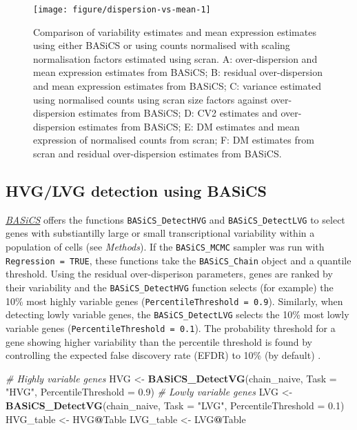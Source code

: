 \documentclass[9pt,a4paper,]{extarticle}
\newenvironment{Shaded}{\begin{snugshade}}{\end{snugshade}}
\newcommand{\CommentTok}[1]{\textcolor[rgb]{0.56,0.35,0.01}{\textit{#1}}}
\newcommand{\DataTypeTok}[1]{\textcolor[rgb]{0.13,0.29,0.53}{#1}}
\newcommand{\FloatTok}[1]{\textcolor[rgb]{0.00,0.00,0.81}{#1}}
\newcommand{\KeywordTok}[1]{\textcolor[rgb]{0.13,0.29,0.53}{\textbf{#1}}}
\newcommand{\NormalTok}[1]{#1}
\newcommand{\OperatorTok}[1]{\textcolor[rgb]{0.81,0.36,0.00}{\textbf{#1}}}
\newcommand{\StringTok}[1]{\textcolor[rgb]{0.31,0.60,0.02}{#1}}
\begin{document}
\begin{figure}

{\centering \texttt{[image: figure/dispersion-vs-mean-1]} 

}

\caption{Comparison of variability estimates and mean expression estimates using either BASiCS or using counts normalised with scaling normalisation factors estimated using scran. A: over-dispersion and mean expression estimates from BASiCS; B: residual over-dispersion and mean expression estimates from BASiCS; C: variance estimated using normalised counts using scran size factors against over-dispersion estimates from BASiCS; D: CV2 estimates and over-dispersion estimates from BASiCS; E: DM estimates and mean expression of normalised counts from scran; F: DM estimates from scran and residual over-dispersion estimates from BASiCS.}\label{fig:dispersion-vs-mean}
\end{figure}

\hypertarget{hvglvg-detection-using-basics}{%
\subsection{HVG/LVG detection using BASiCS}\label{hvglvg-detection-using-basics}}

\emph{\href{https://bioconductor.org/packages/3.11/BASiCS}{BASiCS}} offers the functions \texttt{BASiCS\_DetectHVG} and
\texttt{BASiCS\_DetectLVG} to select genes with substiantilly large or small
transcriptional variability within a population of cells (see \emph{Methods}).
If the \texttt{BASiCS\_MCMC} sampler was run with \texttt{Regression\ =\ TRUE},
these functions take the \texttt{BASiCS\_Chain} object and a quantile threshold.
Using the residual over-disperison parameters, genes are ranked by their
variability and the \texttt{BASiCS\_DetectHVG} function selects (for example) the
10\% most highly variable genes (\texttt{PercentileThreshold\ =\ 0.9}).
Similarly, when detecting lowly variable genes, the \texttt{BASiCS\_DetectLVG} selects
the 10\% most lowly variable genes (\texttt{PercentileThreshold\ =\ 0.1}).
The probability threshold for a gene showing higher variability than the
percentile threshold is found by controlling the expected false discovery
rate (EFDR) to 10\% (by default) \citep{Newton2004}.

\begin{Shaded}
\begin{Highlighting}[]
\CommentTok{# Highly variable genes}
\NormalTok{HVG <-}\StringTok{ }\KeywordTok{BASiCS_DetectVG}\NormalTok{(chain_naive, }\DataTypeTok{Task =} \StringTok{"HVG"}\NormalTok{, }\DataTypeTok{PercentileThreshold =} \FloatTok{0.9}\NormalTok{)}
\CommentTok{# Lowly variable genes}
\NormalTok{LVG <-}\StringTok{ }\KeywordTok{BASiCS_DetectVG}\NormalTok{(chain_naive, }\DataTypeTok{Task =} \StringTok{"LVG"}\NormalTok{, }\DataTypeTok{PercentileThreshold =} \FloatTok{0.1}\NormalTok{)}
\NormalTok{HVG_table <-}\StringTok{ }\NormalTok{HVG}\OperatorTok{@}\NormalTok{Table}
\NormalTok{LVG_table <-}\StringTok{ }\NormalTok{LVG}\OperatorTok{@}\NormalTok{Table}
\end{Highlighting}
\end{Shaded}
\end{document}
